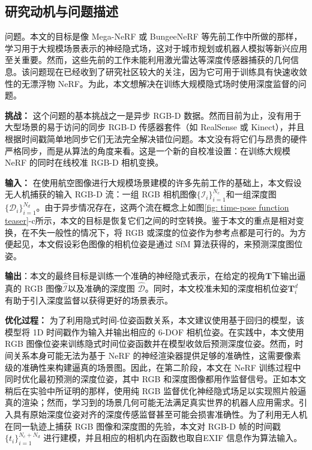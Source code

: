 \subsection{研究动机与问题描述}
问题。本文的目标是像 Mega-NeRF\cite{turki_mega-nerf_2022} 或 BungeeNeRF\cite{xiangli_bungeenerf_2022} 等先前工作中所做的那样，学习用于大规模场景表示的神经隐式场，这对于城市规划或机器人模拟等新兴应用至关重要。然而，这些先前的工作未能利用激光雷达等深度传感器捕获的几何信息。该问题现在已经收到了研究社区较大的关注\cite{deng_depth-supervised_2022,roessle_dense_2022}，因为它可用于训练具有快速收敛性的无漂浮物 NeRF。为此，本文想解决在训练大规模隐式场时使用深度监督的问题。

\textbf{挑战：}
这个问题的基本挑战之一是异步 RGB-D 数据。然而目前为止，没有用于大型场景的易于访问的同步 RGB-D 传感器套件（如 RealSense 或 Kinect），并且根据时间戳简单地同步它们无法完全解决错位问题。本文没有将它们与昂贵的硬件严格同步，而是从算法的角度来看。这是一个新的自校准设置：在训练大规模 NeRF 的同时在线校准 RGB-D 相机变换。

\textbf{输入：} 在使用航空图像进行大规模场景建模的许多先前工作的基础上\cite{turki_mega-nerf_2022,xiangli_bungeenerf_2022}，本文假设无人机捕获的输入 RGB-D 流：一组 RGB 相机图像$\{\mathcal{I}_i\}_{i=1}^{N_c}$和一组深度图$\{\mathcal{D}_i\}_{i=1}^{N_d}$。由于异步情况存在，这两个流在概念上如图\ref{fig: time-pose function teaser}-c所示，本文的目标是恢复它们之间的时空转换。鉴于本文的重点是相对变换，在不失一般性的情况下，将 RGB 或深度的位姿作为参考点都是可行的。为方便起见，本文假设彩色图像的相机位姿是通过 SfM 算法获得的，来预测深度图位姿。

\textbf{输出}：本文的最终目标是训练一个准确的神经隐式表示，在给定的视角$\mathbf{T}$下输出逼真的 RGB 图像$\hat{\mathcal{I}}$以及准确的深度图 $\hat{\mathcal{D}}$。同时，本文校准未知的深度相机位姿$\mathbf{T}_i^d$ 有助于引入深度监督以获得更好的场景表示。

\textbf{优化过程：}
为了利用隐式时间-位姿函数关系，本文建议使用基于回归的模型，该模型将 1D 时间戳作为输入并输出相应的 6-DOF 相机位姿。在实践中，本文使用 RGB 图像位姿来训练隐式时间位姿函数并在模型收敛后预测深度位姿。然而，时间关系本身可能无法为基于 NeRF 的神经渲染器提供足够的准确性，这需要像素级的准确性来构建逼真的场景图。因此，在第二阶段，本文在 NeRF 训练过程中同时优化最初预测的深度位姿，其中 RGB 和深度图像都用作监督信号。正如本文稍后在实验中所证明的那样，使用纯 RGB 监督优化神经隐式场足以实现照片般逼真的渲染；然而，学习到的场景几何可能无法满足真实世界的机器人应用需求。引入具有原始深度位姿对齐的深度传感监督甚至可能会损害准确性。为了利用无人机在同一轨迹上捕获 RGB 图像和深度图的先验，本文对 RGB-D 帧的时间戳$\{t_i\}_{i=1}^{N_c+N_d}$ 进行建模，并且相应的相机内在函数也取自EXIF 信息作为算法输入。

